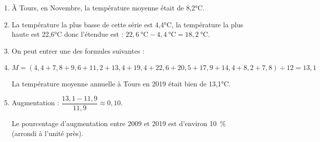 
\begin{enumerate}[itemsep=1em]
   \item À Tours, en Novembre, la température moyenne était de 8,2°C.

    \item La température la plus basse de cette série est 4,4°C, la température la plus haute est 22,6°C donc l'étendue est : $22,6~\text{°C}-4,4~\text{°C}=18,2~\text{°C}$.
    
    \item On peut entrer une des formules suivantes : 
     
    
    \item $M = (4,4+7,8+9,6+11,2+13,4+19,4+22,6+20,5+17,9+14,4+8,2+7,8)\div12=13,1$
    
    \medskip
    La température  moyenne annuelle à Tours en 2019 était bien de 13,1°C.
    
    \item Augmentation : $\dfrac{13,1-11,9}{11,9}\approx0,10$. 
    
    \medskip
    Le pourcentage d'augmentation entre 2009 et 2019 est d'environ 10~\% (arrondi à l'unité près).
\end{enumerate}

\medskip

